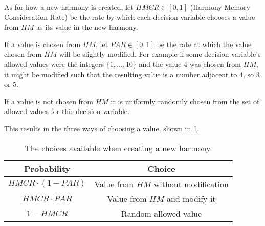 As for how a new harmony is created, let $HMCR \in [0,1]$ (Harmony Memory Consideration Rate) be the rate by which each decision variable chooses a value from $HM$ as its value in the new harmony.

If a value is chosen from $HM$, let $PAR \in [0,1]$ be the rate at which the value chosen from $HM$ will be slightly modified.
For example if some decision variable's allowed values were the integers $\{1, \dots, 10\}$ and the value $4$ was chosen from $HM$, it might be modified such that the resulting value is a number adjacent to $4$, so $3$ or $5$.

If a value is not chosen from $HM$ it is uniformly randomly chosen from the set of allowed values for this decision variable.

This results in the three ways of choosing a value, shown in \cref{tab:04:hschoices}.

\begin{table}[t]
    \centering
    \begin{tabular}{|c|c|}\hline
        \textbf{Probability} & \textbf{Choice}\\ \hline
        $HMCR \cdot (1 - PAR)$ & Value from $HM$ without modification\\\hline
        $HMCR \cdot PAR$ & Value from $HM$ and modify it\\\hline
        $1 - HMCR$ & Random allowed value\\\hline 
    \end{tabular}
    \caption{The choices available when creating a new harmony.}
    \label{tab:04:hschoices}
\end{table}